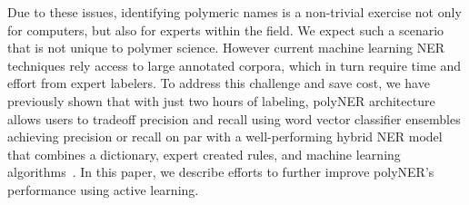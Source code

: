 Due to these issues, identifying polymeric names is a non-trivial exercise not only for computers, but also for experts within the field. 
We expect such a scenario that is not unique to polymer science.
However current machine learning NER techniques rely access to large annotated corpora, which in turn require time and effort from expert labelers.
To address this challenge and save cost,
we have previously shown that with just two hours of labeling, polyNER architecture allows users to tradeoff precision and recall using word vector classifier ensembles achieving precision or recall on par with a well-performing hybrid NER model
that combines a dictionary, expert created rules, and machine learning algorithms~\cite{tchoua2019polyner}. 
In this paper, we describe efforts to further improve polyNER's performance using active learning.
